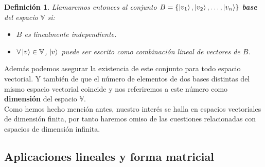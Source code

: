 \documentclass[a4paper]{article}
\newtheorem{deff}{Definición}[section]
\numberwithin{equation}{section}
\begin{document}
\begin{deff} Llamaremos entonces al conjunto $B = \{ \ket{v_1},\ket{v_2}, \ldots, \ket{v_n} \}$ \textbf{base} del espacio $\mathbb{V}$ si:
\begin{itemize}
\item $B$ es linealmente independiente.

\item $\forall \ket{v} \in \mathbb{V}$, $\ket{v}$ puede ser escrito como combinación lineal de vectores de $B$.
\end{itemize}
\end{deff}

Además podemos asegurar la existencia de este conjunto para todo espacio vectorial. Y también de que el número de elementos de dos bases distintas del mismo espacio vectorial coincide y nos referiremos a este número como \textbf{dimensión} del espacio $\mathbb{V}$.
\\
Como hemos hecho mención antes, nuestro interés se halla en espacios vectoriales de dimensión finita, por tanto haremos omiso de las cuestiones relacionadas con espacios de dimensión infinita.

\subsection{Aplicaciones lineales y forma matricial}
\end{document}
